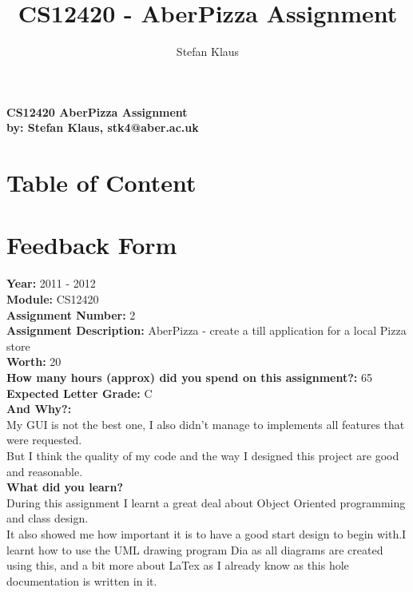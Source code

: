 \documentclass[11pt,a4paper]{article}
\author{Stefan Klaus}
\title{CS12420 - AberPizza Assignment}
\begin{document}
\begin{center}
\textbf{CS12420 AberPizza Assignment}\\
\textbf{by: Stefan Klaus, stk4@aber.ac.uk}
\end{center}
\begin{flushleft}
\newpage
\section{Table of Content}
\tableofcontents
\newpage
\section{Feedback Form}
\textbf{Year:} 2011 - 2012\\
\textbf{Module:} CS12420\\
\textbf{Assignment Number:} 2\\
\textbf{Assignment Description:} AberPizza - create a till application for a local Pizza store \\
\vspace{11pt}
\textbf{Worth:} 20%
\\
\textbf{How many hours (approx) did you spend on this assignment?:} 65\\
\vspace{11pt}
\textbf{Expected Letter Grade:} C\\
\textbf{And Why?:}\\
My GUI is not the best one, I also didn't manage to implements all features that were requested.\\
But I think the quality of my code and the way I designed this project are good and reasonable.\\
\vspace{11pt}
\textbf{What did you learn?}\\
During this assignment I learnt a great deal about Object Oriented programming and class design.\\
It also showed me how important it is to have a good start design to begin with.I learnt how to use the UML drawing program Dia as all diagrams are created using this, and a bit more about LaTex as I already know as this hole documentation is written in it. 
\newpage


\end{flushleft}
\end{document}
